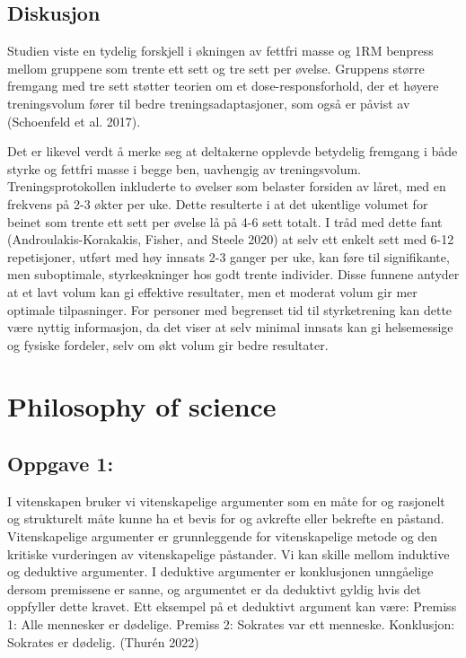 \documentclass[
  letterpaper,
  DIV=11,
  numbers=noendperiod]{scrreprt}
\begin{document}
\section{Diskusjon}\label{diskusjon-3}

Studien viste en tydelig forskjell i økningen av fettfri masse og 1RM
benpress mellom gruppene som trente ett sett og tre sett per øvelse.
Gruppens større fremgang med tre sett støtter teorien om et
dose-responsforhold, der et høyere treningsvolum fører til bedre
treningsadaptasjoner, som også er påvist av (Schoenfeld et al. 2017).

Det er likevel verdt å merke seg at deltakerne opplevde betydelig
fremgang i både styrke og fettfri masse i begge ben, uavhengig av
treningsvolum. Treningsprotokollen inkluderte to øvelser som belaster
forsiden av låret, med en frekvens på 2-3 økter per uke. Dette
resulterte i at det ukentlige volumet for beinet som trente ett sett per
øvelse lå på 4-6 sett totalt. I tråd med dette fant
(Androulakis-Korakakis, Fisher, and Steele 2020) at selv ett enkelt sett
med 6-12 repetisjoner, utført med høy innsats 2-3 ganger per uke, kan
føre til signifikante, men suboptimale, styrkeøkninger hos godt trente
individer. Disse funnene antyder at et lavt volum kan gi effektive
resultater, men et moderat volum gir mer optimale tilpasninger. For
personer med begrenset tid til styrketrening kan dette være nyttig
informasjon, da det viser at selv minimal innsats kan gi helsemessige og
fysiske fordeler, selv om økt volum gir bedre resultater.


\chapter{Philosophy of science}\label{philosophy-of-science}

\section{Oppgave 1:}\label{oppgave-1-1}

I vitenskapen bruker vi vitenskapelige argumenter som en måte for og
rasjonelt og strukturelt måte kunne ha et bevis for og avkrefte eller
bekrefte en påstand. Vitenskapelige argumenter er grunnleggende for
vitenskapelige metode og den kritiske vurderingen av vitenskapelige
påstander. Vi kan skille mellom induktive og deduktive argumenter. I
deduktive argumenter er konklusjonen unngåelige dersom premissene er
sanne, og argumentet er da deduktivt gyldig hvis det oppfyller dette
kravet. Ett eksempel på et deduktivt argument kan være: Premiss 1: Alle
mennesker er dødelige. Premiss 2: Sokrates var ett menneske. Konklusjon:
Sokrates er dødelig. (Thurén 2022)
\end{document}
